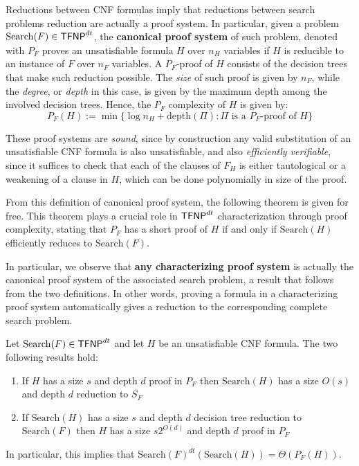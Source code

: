 Reductions between CNF formulas imply that reductions between search problems reduction are actually a proof system. In particular, given a problem $\mathrm{Search}(F) \in \mathsf{TFNP}^{dt}$, the \textbf{canonical proof system} of such problem, denoted with $P_F$ proves an unsatisfiable formula $H$ over $n_H$ variables if $H$ is reducible to an instance of $F$ over $n_F$ variables. A $P_F$-proof of $H$ consists of the decision trees that make such reduction possible. The \textit{size} of such proof is given by $n_F$, while the \textit{degree}, or \textit{depth} in this case, is given by the maximum depth among the involved decision trees. Hence, the $P_F$ complexity of $H$ is given by:
\[P_F(H) := \min\{\log n_H + \mathrm{depth}(\Pi) : \Pi \text{ is a $P_F$-proof of } H\}\]

These proof systems are \textit{sound}, since by construction any valid substitution of an unsatisfiable CNF formula is also unsatisfiable, and also \textit{efficiently verifiable}, since it suffices to check that each of the clauses of $F_H$ is either tautological or a weakening of a clause in $H$, which can be done polynomially in size of the proof.

From this definition of canonical proof system, the following theorem is given for free. This theorem plays a crucial role in $\mathsf{TFNP}^{dt}$ characterization through proof complexity, stating that $P_F$ has a short proof of $H$ if and only if $\mathrm{Search}(H)$ efficiently reduces to $\mathrm{Search}(F)$. 

In particular, we observe that \textbf{any characterizing proof system} is actually the canonical proof system of the associated search problem, a result that follows from the two definitions. In other words, proving a formula in a characterizing proof system automatically gives a reduction to the corresponding complete search problem.

\begin{theorem}
    Let $\mathrm{Search}(F) \in \mathsf{TFNP}^{dt}$ and let $H$ be an unsatisfiable CNF formula. The two following results hold:
    \begin{enumerate}
        \item If $H$ has a size $s$ and depth $d$ proof in $P_F$ then $\mathrm{Search}(H)$ has a size $O(s)$ and depth $d$ reduction to $S_F$
        \item If $\mathrm{Search}(H)$ has a size $s$ and depth $d$ decision tree reduction to $\mathrm{Search}(F)$ then $H$ has a size $s2^{O(d)}$ and depth $d$ proof in $P_F$
    \end{enumerate}
    In particular, this implies that $\mathrm{Search}(F)^{dt}(\mathrm{Search}(H)) = \Theta(P_F(H))$.
\end{theorem}

